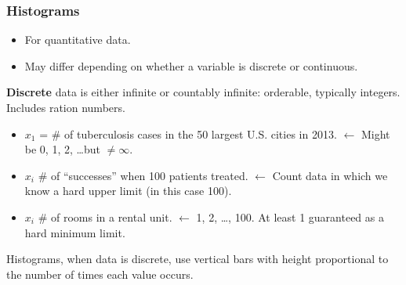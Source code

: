 \documentclass[../Notes.tex]{subfiles}
\begin{document}
    \subsubsection{Histograms}

    \begin{itemize}
        \item For quantitative data.
        \item May differ depending on whether a variable is discrete or continuous.
    \end{itemize}

    \textbf{Discrete} data is either infinite or countably infinite: orderable, typically integers. Includes ration numbers.

    \begin{itemize}
        \item $x_1$ = \# of tuberculosis cases in the 50 largest U.S. cities in 2013. $\leftarrow$ Might be 0, 1, 2, \dots but $\neq \infty$.
        \item $x_i$ \# of ``successes'' when 100 patients treated. $\leftarrow$ Count data in which we know a hard upper limit (in this case 100).
        \item $x_i$ \# of rooms in a rental unit. $\leftarrow$ 1, 2, \dots, 100. At least 1 guaranteed as a hard minimum limit.
    \end{itemize}

    Histograms, when data is discrete, use vertical bars with height proportional to the number of times each value occurs.
\end{document}
